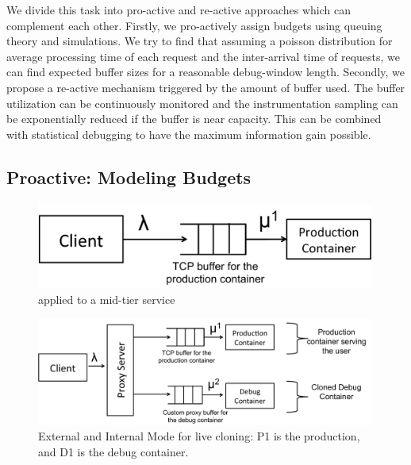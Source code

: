 We divide this task into  pro-active and re-active approaches which can complement each other. Firstly, we pro-actively assign budgets using queuing theory and simulations. We try to find that assuming a poisson distribution for average processing time of each request and the inter-arrival time of requests, we can find expected buffer sizes for a reasonable debug-window length. Secondly, we propose a re-active mechanism triggered by the amount of buffer used. The buffer utilization can be continuously monitored and the instrumentation sampling can be exponentially reduced if the buffer is near capacity. This can be combined with statistical debugging to have the maximum information gain possible. 

\subsection{Proactive: Modeling Budgets}
\label{sec:activeProactiveModeling}


\begin{figure}[t!]

		\centering
		\includegraphics[width=0.99\textwidth]{queue/figs/queue.pdf}
		\caption{\parikshan applied to a mid-tier service}
		\label{fig:queueModel}
\end{figure}
\begin{figure}
		\centering
		\includegraphics[width=0.99\textwidth]{queue/figs/queueCloned.pdf}
		\caption{External and Internal Mode for live cloning: P1 is the production, and D1 is the debug container.}
		\label{fig:queueClonedModel}
\end{figure}
	

